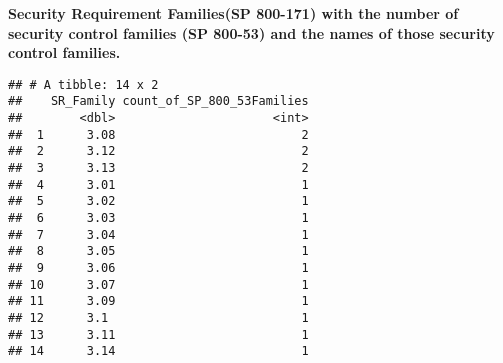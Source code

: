 \documentclass[]{article}
\newenvironment{Shaded}{\begin{snugshade}}{\end{snugshade}}
\newcommand{\KeywordTok}[1]{\textcolor[rgb]{0.13,0.29,0.53}{\textbf{#1}}}
\newcommand{\DataTypeTok}[1]{\textcolor[rgb]{0.13,0.29,0.53}{#1}}
\newcommand{\StringTok}[1]{\textcolor[rgb]{0.31,0.60,0.02}{#1}}
\newcommand{\OperatorTok}[1]{\textcolor[rgb]{0.81,0.36,0.00}{\textbf{#1}}}
\newcommand{\NormalTok}[1]{#1}
\begin{document}
\textbf{Security Requirement Families(SP 800-171) with the number of
security control families (SP 800-53) and the names of those security
control families.}

\begin{Shaded}
\end{Shaded}

\begin{verbatim}
## # A tibble: 14 x 2
##    SR_Family count_of_SP_800_53Families
##        <dbl>                      <int>
##  1      3.08                          2
##  2      3.12                          2
##  3      3.13                          2
##  4      3.01                          1
##  5      3.02                          1
##  6      3.03                          1
##  7      3.04                          1
##  8      3.05                          1
##  9      3.06                          1
## 10      3.07                          1
## 11      3.09                          1
## 12      3.1                           1
## 13      3.11                          1
## 14      3.14                          1
\end{verbatim}

\begin{Shaded}
\end{Shaded}
\end{document}
